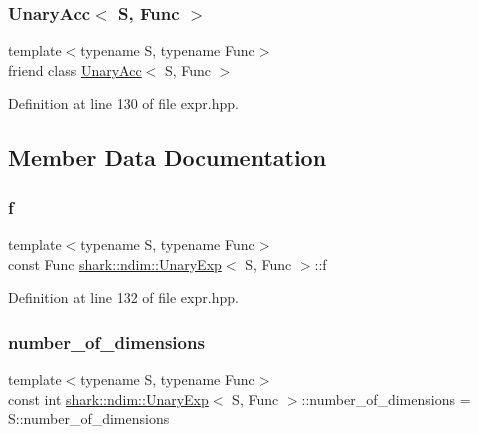 \subsubsection{\texorpdfstring{Unary\+Acc$<$ S, Func $>$}{UnaryAcc< S, Func >}}
{\footnotesize\ttfamily template$<$typename S, typename Func$>$ \\
friend class \hyperlink{classshark_1_1ndim_1_1_unary_acc}{Unary\+Acc}$<$ S, Func $>$\hspace{0.3cm}{\ttfamily [friend]}}



Definition at line 130 of file expr.\+hpp.



\subsection{Member Data Documentation}
\hypertarget{classshark_1_1ndim_1_1_unary_exp_a7d3fe16a63fc7e035839407f24b586b9}{}\label{classshark_1_1ndim_1_1_unary_exp_a7d3fe16a63fc7e035839407f24b586b9} 
\subsubsection{\texorpdfstring{f}{f}}
{\footnotesize\ttfamily template$<$typename S, typename Func$>$ \\
const Func \hyperlink{classshark_1_1ndim_1_1_unary_exp}{shark\+::ndim\+::\+Unary\+Exp}$<$ S, Func $>$\+::f\hspace{0.3cm}{\ttfamily [private]}}



Definition at line 132 of file expr.\+hpp.

\hypertarget{classshark_1_1ndim_1_1_unary_exp_a333e05cf6d425d7f42b3f7eb575e6bcb}{}\label{classshark_1_1ndim_1_1_unary_exp_a333e05cf6d425d7f42b3f7eb575e6bcb} 
\subsubsection{\texorpdfstring{number\+\_\+of\+\_\+dimensions}{number\_of\_dimensions}}
{\footnotesize\ttfamily template$<$typename S, typename Func$>$ \\
const int \hyperlink{classshark_1_1ndim_1_1_unary_exp}{shark\+::ndim\+::\+Unary\+Exp}$<$ S, Func $>$\+::number\+\_\+of\+\_\+dimensions = S\+::number\+\_\+of\+\_\+dimensions\hspace{0.3cm}{\ttfamily [static]}}



